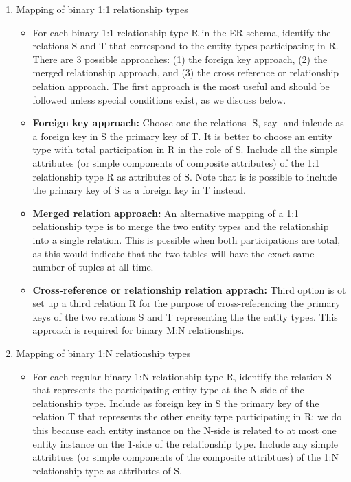 \documentclass[12pt]{article}
\begin{document}
\begin{enumerate}
\begin{itemize}
				\end{itemize}
			\item
				Mapping of binary 1:1 relationship types
				\begin{itemize}
					\item
						For each binary 1:1 relationship type R in the ER schema, identify the relations S and T that correspond to the entity types participating in R. There are 3 possible approaches: (1) the foreign key approach, (2) the merged relationship approach, and (3) the cross reference or relationship relation approach. The first approach is the most useful and should be followed unless special conditions exist, as we discuss below.
					\item
						\textbf{Foreign key approach:}  Choose one the relations- S, say- and inlcude as a foreign key in S the primary key of T. It is better to choose an entity type with total participation in R in the role of S. Include all the simple attributes (or simple components of composite attributes) of the 1:1 relationship type R as attributes of S. Note that is is possible to include the primary key of S as a foreign key in T instead.
					\item
						\textbf{Merged relation approach:} An alternative mapping of a 1:1 relationship type is to merge the two entity types and the relationship into a single relation. This is possible when both participations are total, as this would indicate that the two tables will have the exact same number of tuples at all time.
					\item
						\textbf{Cross-reference or relationship relation apprach:} Third option is ot set up a third relation R for the purpose of cross-referencing the primary keys of the two relations S and T representing the the entity types. This approach is required for binary M:N relationships.
				\end{itemize}
			\item
				Mapping of binary 1:N relationship types
				\begin{itemize}
					\item
						For each regular binary 1:N relationship type R, identify the relation S that represents the participating entity type at the N-side of the relationship type. Include as foreign key in S the primary key of the relation T that represents the other eneity type participating in R; we do this because each entity instance on the N-side is related to at most one entity instance on the 1-side of the relationship type. Include any simple attribtues (or simple components of the composite attribtues) of the 1:N relationship type as attributes of S.

\end{itemize}
\end{enumerate}
\end{document}
